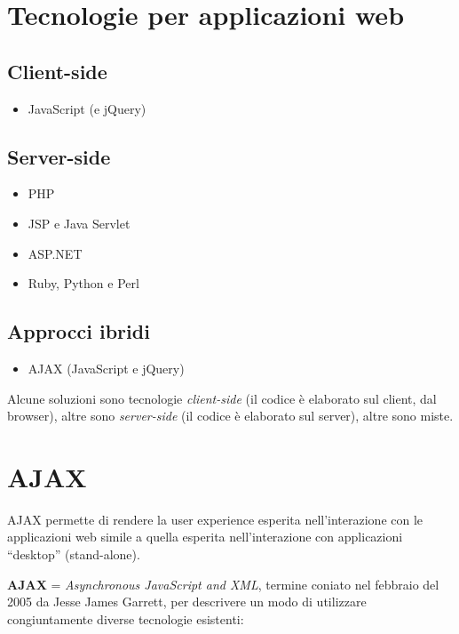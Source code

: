 \section{Tecnologie per applicazioni web}

\subsection{Client-side}

\begin{itemize}
    \item JavaScript (e jQuery)
\end{itemize}

\subsection{Server-side}

\begin{itemize}
    \item PHP
    \item JSP e Java Servlet
    \item ASP.NET
    \item Ruby, Python e Perl
\end{itemize}

\subsection{Approcci ibridi}

\begin{itemize}
    \item AJAX (JavaScript e jQuery)
\end{itemize}

Alcune soluzioni sono tecnologie \textit{client-side} (il codice è elaborato sul client, dal browser), altre sono \textit{server-side} (il codice è elaborato sul server), altre sono miste.

\section{AJAX}

AJAX permette di rendere la user experience esperita nell'interazione con le applicazioni web simile a quella esperita nell'interazione con applicazioni ``desktop'' (stand-alone).

\textbf{AJAX} = \textit{Asynchronous JavaScript and XML}, termine coniato nel febbraio del 2005 da Jesse James Garrett, per descrivere un modo di utilizzare congiuntamente diverse tecnologie esistenti:


